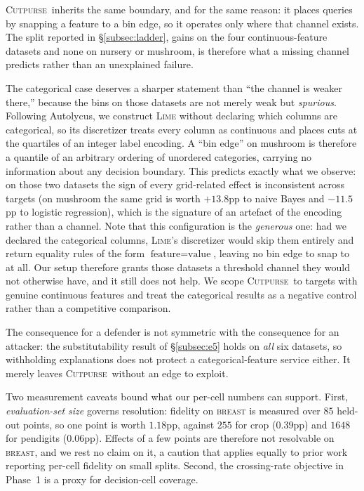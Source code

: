 \documentclass[sigconf,anonymous,review]{acmart}
\newcommand{\sys}{\textsc{Cutpurse}}
\begin{document}
\sys\ inherits the same boundary, and for the same reason: it places queries by snapping a feature to
a bin edge, so it operates only where that channel exists. The split reported in
\S\ref{subsec:ladder}, gains on the four continuous-feature datasets and none on nursery or mushroom,
is therefore what a missing channel predicts rather than an unexplained failure.

The categorical case deserves a sharper statement than ``the channel is weaker there,'' because the
bins on those datasets are not merely weak but \emph{spurious}. Following Autolycus, we construct
\textsc{Lime} without declaring which columns are categorical, so its discretizer treats every column
as continuous and places cuts at the quartiles of an integer label encoding. A ``bin edge'' on
mushroom is therefore a quantile of an arbitrary ordering of unordered categories, carrying no
information about any decision boundary. This predicts exactly what we observe: on those two datasets
the sign of every grid-related effect is inconsistent across targets (on mushroom the same grid is worth $+13.8$pp to naive Bayes and $-11.5$pp to logistic regression), which is the signature of an
artefact of the encoding rather than a channel. Note that this configuration is the
\emph{generous} one: had we declared the categorical columns, \textsc{Lime}'s discretizer would skip
them entirely and return equality rules of the form $\text{feature}{=}\text{value}$, leaving no bin
edge to snap to at all. Our setup therefore grants those datasets a threshold channel they would not
otherwise have, and it still does not help. We scope \sys\ to targets with genuine continuous
features and treat the categorical results as a negative control rather than a competitive
comparison.

The consequence for a defender is not symmetric with the consequence for an attacker: the
substitutability result of \S\ref{subsec:e5} holds on \emph{all} six datasets, so withholding
explanations does not protect a categorical-feature service either. It merely leaves \sys\ without an
edge to exploit.

Two measurement caveats bound what our per-cell numbers can support. First, \emph{evaluation-set size}
governs resolution: fidelity on \textsc{breast} is measured over $85$ held-out points, so one point is
worth $1.18$pp, against $255$ for crop ($0.39$pp) and $1648$ for pendigits ($0.06$pp). Effects of a few
points are therefore not resolvable on \textsc{breast}, and we rest no claim on it, a caution that
applies equally to prior work reporting per-cell fidelity on small splits. Second, the
crossing-rate objective in Phase~1 is a proxy for decision-cell coverage.
\end{document}
